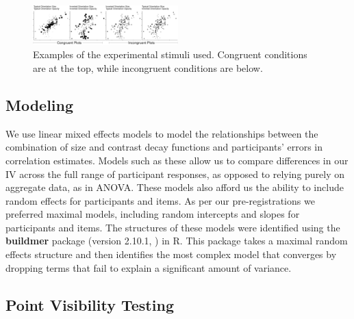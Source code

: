 \documentclass[manuscript, review, anonymous, screen]{acmart}
\begin{document}
\begin{figure}

\includegraphics[width=0.5\textwidth,height=\textheight]{size_and_opacity_files/figure-pdf/fig-examples-1.pdf} \hfill{}

\caption{\label{fig-examples}Examples of the experimental stimuli used.
Congruent conditions are at the top, while incongruent conditions are
below.}

\end{figure}

\hypertarget{sec-gen-modelling}{%
\subsection{Modeling}\label{sec-gen-modelling}}

We use linear mixed effects models to model the relationships between
the combination of size and contrast decay functions and participants'
errors in correlation estimates. Models such as these allow us to
compare differences in our IV across the full range of participant
responses, as opposed to relying purely on aggregate data, as in ANOVA.
These models also afford us the ability to include random effects for
participants and items. As per our pre-registrations we preferred
maximal models, including random intercepts and slopes for participants
and items. The structures of these models were identified using the
\textbf{buildmer} package (version 2.10.1, \citep{voeten_buildmer}) in
R. This package takes a maximal random effects structure and then
identifies the most complex model that converges by dropping terms that
fail to explain a significant amount of variance.

\hypertarget{sec-VT}{%
\subsection{Point Visibility Testing}\label{sec-VT}}
\end{document}
